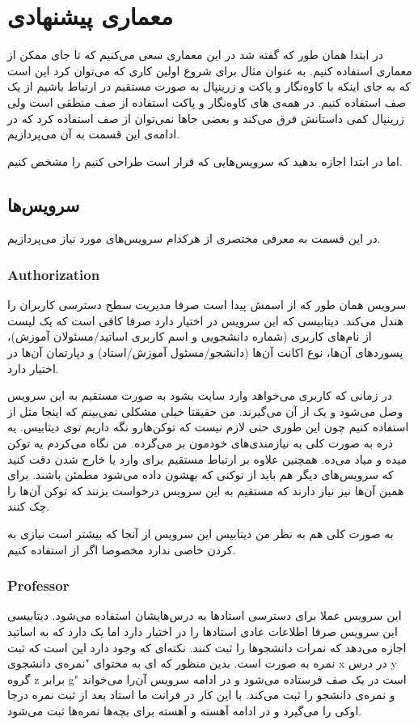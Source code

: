 \section{معماری پیشنهادی}
در ابتدا همان طور که گفته شد در این معماری سعی می‌کنیم که تا جای ممکن از معماری
استفاده کنیم. به عنوان مثال برای شروع اولین کاری که می‌توان کرد این است که به جای اینکه با کاوه‌نگار و پاکت
و زرینپال به صورت مستقیم در ارتباط باشیم از یک صف استفاده کنیم. در همه‌ی
های
کاوه‌نگار و پاکت استفاده از صف منطقی است ولی زرینپال کمی داستانش فرق می‌کند و بعضی جا‌ها نمی‌توان از
صف استفاده کرد که در ادامه‌ی این قسمت به آن می‌پردازیم.

اما در ابتدا اجازه بدهید که سرویس‌هایی که قرار است طراحی کنیم را مشخص کنیم.
\subsection{سرویس‌ها}
در این قسمت به معرفی مختصری از هرکدام سرویس‌های مورد نیاز می‌پردازیم.
\subsubsection{Authorization}
سرویس
همان طور که از اسمش پیدا است صرفا مدیریت سطح دسترسی کاربران را هندل می‌کند.
دیتابیسی که این سرویس در اختیار دارد صرفا کافی است که یک لیست از نام‌های کاربری
(شماره دانشجویی و اسم کاربری اساتید/مسئولان آموزش)،
 پسورد‌های آن‌ها، نوع اکانت آن‌ها
(دانشجو/مسئول آموزش/استاد)
و دپارتمان آن‌ها در اختیار دارد.

در زمانی که کاربری می‌خواهد وارد سایت بشود به صورت مستقیم به این سرویس وصل می‌شود و یک
از آن می‌گیرند. من حقیقتا خیلی مشکلی نمی‌بینم که اینجا مثل
از
استفاده کنیم چون این طوری حتی لازم نیست که توکن‌هارو نگه داریم توی دیتابیس. یه ذره به صورت کلی
به نیازمندی‌های خودمون بر می‌گرده. من نگاه می‌کردم
یه توکن میده و
میاد
می‌ده. همچنین علاوه بر ارتباط مستقیم برای وارد یا خارج شدن دقت کنید که سرویس‌های دیگر هم باید
از توکنی که بهشون داده می‌شود مطمئن باشند. برای همین آن‌ها نیز نیاز دارند که مستقیم به این سرویس
درخواست بزنند که توکن آن‌‌ها را چک کنند.

به صورت کلی هم به نظر من دیتابیس این سرویس از آنجا که بیشتر
است نیازی به
کردن خاصی ندارد مخصوصا اگر از
استفاده کنیم.
\subsubsection{Professor}
این سرویس عملا برای دسترسی استاد‌ها به درس‌هایشان استفاده می‌شود. دیتابیسی این سرویس 
صرفا اطلاعات عادی استاد‌ها را در اختیار دارد اما یک
دارد که به اساتید اجازه می‌دهد که نمرات دانشجو‌ها را ثبت کنند. نکته‌ای که وجود دارد این است که ثبت نمره
به صورت
است. بدین منظور که
ای
به محتوای
"نمره‌ی دانشجوی x در درس y گروه z برابر g"
است در یک صف فرستاده می‌شود و در ادامه سرویس
آن‌را می‌خواند و نمره‌ی دانشجو را ثبت می‌کند. با این کار در فرانت ما استاد بعد از ثبت نمره درجا
اوکی را می‌گیرد و در ادامه آهسته و آهسته برای بچه‌ها نمره‌ها ثبت می‌شود.
